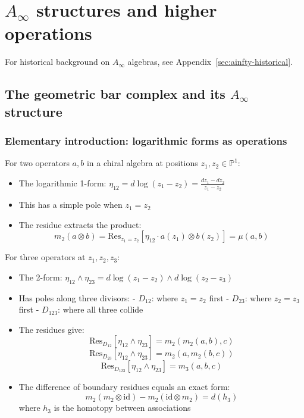 \section{\texorpdfstring{$A_\infty$ structures and higher operations}{A-infinity structures and higher operations}}

For historical background on $A_\infty$ algebras, see Appendix~\ref{sec:ainfty-historical}.


\subsection{\texorpdfstring{The geometric bar complex and its $A_\infty$ structure}{The geometric bar complex and its A-infinity structure}}

\subsubsection{Elementary introduction: logarithmic forms as operations}

\begin{example}
For two operators $a, b$ in a chiral algebra at positions $z_1, z_2 \in \mathbb{P}^1$:
\begin{itemize}
\item The logarithmic 1-form: $\eta_{12} = d\log(z_1 - z_2) = \frac{dz_1 - dz_2}{z_1 - z_2}$
\item This has a simple pole when $z_1 = z_2$
\item The residue extracts the product:
\[m_2(a \otimes b) = \text{Res}_{z_1=z_2}\left[\eta_{12} \cdot a(z_1) \otimes b(z_2)\right] = \mu(a,b)\]
\end{itemize}
\end{example}

\begin{example}
For three operators at $z_1, z_2, z_3$:
\begin{itemize}
\item The 2-form: $\eta_{12} \wedge \eta_{23} = d\log(z_1-z_2) \wedge d\log(z_2-z_3)$
\item Has poles along three divisors:
  - $D_{12}$: where $z_1 = z_2$ first
  - $D_{23}$: where $z_2 = z_3$ first  
  - $D_{123}$: where all three collide
\item The residues give:
\[\text{Res}_{D_{12}}[\eta_{12} \wedge \eta_{23}] = m_2(m_2(a,b),c)\]
\[\text{Res}_{D_{23}}[\eta_{12} \wedge \eta_{23}] = m_2(a,m_2(b,c))\]
\[\text{Res}_{D_{123}}[\eta_{12} \wedge \eta_{23}] = m_3(a,b,c)\]
\item The difference of boundary residues equals an exact form:
\[m_2(m_2 \otimes \text{id}) - m_2(\text{id} \otimes m_2) = d(h_3)\]
where $h_3$ is the homotopy between associations
\end{itemize}
\end{example}

